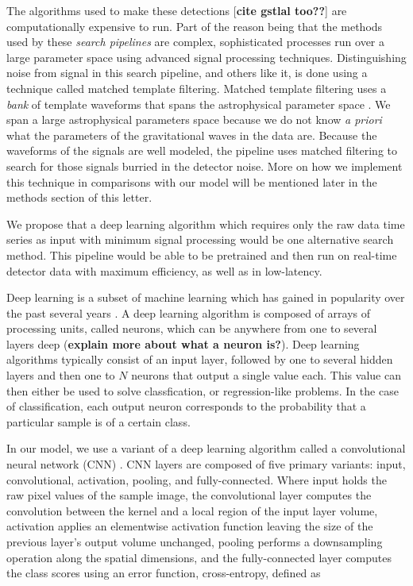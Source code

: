 \documentclass[%
 amsmath,amssymb,
 aps,
 twocolumn,
 prl,
 reprint,
floatfix,
]{revtex4-1}
\begin{document}
The algorithms used to make these detections \cite{0264-9381-33-21-215004} [\textbf{cite gstlal too??}] are computationally expensive to run. Part of the reason being that the methods used by these \textit{search pipelines} are complex, sophisticated processes run over a large parameter space using advanced signal processing techniques. Distinguishing noise from signal in this search pipeline, and others like it, is done using a technique called matched template filtering. Matched template filtering uses a \textit{bank} of template waveforms that spans the astrophysical parameter space \cite{PhysRevD.44.3819, PhysRevD.49.1707, PhysRevD.53.6749, PhysRevD.60.022002, 0264-9381-23-18-002, PhysRevD.80.104014, PhysRevD.86.084017, PhysRevD.89.084041, PhysRevD.87.124003, 1307.4158, PhysRevD.89.024003, PhysRevD.93.124007}. We span a large astrophysical parameters space because we do not know \textit{a priori} what the parameters of the gravitational waves in the data are. Because the waveforms of the signals are well modeled, the pipeline uses matched filtering to search for those signals burried in the detector noise. More on how we implement this technique in comparisons with our model will be mentioned later in the methods section of this letter.

We propose that a deep learning algorithm which requires only the raw data time series as input with minimum signal processing would be one alternative search method. This pipeline would be able to be pretrained and then run on real-time detector data with maximum efficiency, as well as in low-latency.

Deep learning is a subset of machine learning which has gained in popularity over the past several years \cite{NIPS2012_4824, 1406.2661, 1409.1556, 1412.7062, 1311.2901, 1409.4842}. A deep learning algorithm is composed of arrays of processing units, called neurons, which can be anywhere from one to several layers deep (\textbf{explain more about what a neuron is?}). Deep learning algorithms typically consist of an input layer, followed by one to several hidden layers and then one to $N$ neurons that output a single value each. This value can then either be used to solve classfication, or regression-like problems. In the case of classification, each output neuron corresponds to the probability that a particular sample is of a certain class. 

In our model, we use a variant of a deep learning algorithm called a convolutional neural network (CNN) \cite{726791}. CNN layers are composed of five primary variants: input, convolutional, activation, pooling, and fully-connected. Where input holds the raw pixel values of the sample image, the convolutional layer computes the convolution between the kernel and a local region of the input layer volume, activation applies an elementwise activation function leaving the size of the previous layer's output volume unchanged, pooling performs a downsampling operation along the spatial dimensions, and the fully-connected layer computes the class scores using an error function, cross-entropy, defined as
\end{document}
